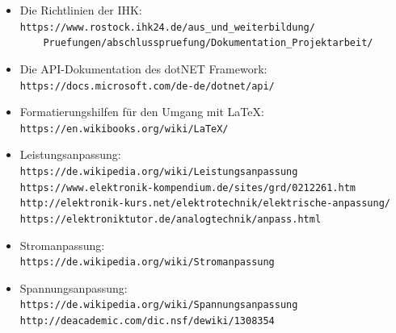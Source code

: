 \documentclass[a4paper]{article}
\begin{document}
\begin{itemize}
    \item Die Richtlinien der IHK:\\
    \verb|https://www.rostock.ihk24.de/aus_und_weiterbildung/|\\
    \verb|    Pruefungen/abschlusspruefung/Dokumentation_Projektarbeit/|
    
    \item Die API-Dokumentation des \glqq dotNET Framework\grqq{}:\\
    \verb|https://docs.microsoft.com/de-de/dotnet/api/|\\
    
    \item Formatierungshilfen für den Umgang mit \LaTeX:\\
    \verb|https://en.wikibooks.org/wiki/LaTeX/|\\
    
    \item Leistungsanpassung:\\
    \verb|https://de.wikipedia.org/wiki/Leistungsanpassung|\\
    \verb|https://www.elektronik-kompendium.de/sites/grd/0212261.htm|\\
    \verb|http://elektronik-kurs.net/elektrotechnik/elektrische-anpassung/|\\
    \verb|https://elektroniktutor.de/analogtechnik/anpass.html|\\
    
    \item Stromanpassung:\\
    \verb|https://de.wikipedia.org/wiki/Stromanpassung|\\
    
    \item Spannungsanpassung:\\
    \verb|https://de.wikipedia.org/wiki/Spannungsanpassung|\\
    \verb|http://deacademic.com/dic.nsf/dewiki/1308354|\\
    
\end{itemize}
\end{document}
